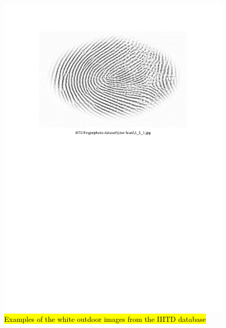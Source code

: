 \documentclass[review]{elsarticle}
\begin{document}
		\begin{figure}[!h]
			\centering
			\includegraphics[page=5,scale=.65,trim=2cm 15cm 2cm 2cm,clip]{IIITD_dataset.pdf}
			\caption{\hl{Examples of the white outdoor images from the IIITD database}}
			\label{fig:IIITD_White_Outdoor}
		\end{figure}
\end{document}
